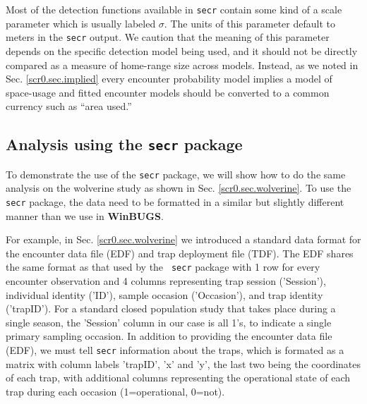 Most of the detection functions available in \mbox{\tt secr} contain
some kind of a scale parameter which is usually labeled $\sigma$.  The
units of this parameter default to meters in the \mbox{\tt secr}
output.  We caution that the meaning of this parameter depends on the
specific detection model being used, and it should not be directly compared as a
measure of home-range size across models. Instead, as we noted in
Sec. \ref{scr0.sec.implied} every encounter probability model implies
a model of space-usage and fitted encounter models should be converted
to a common currency such as ``area used.''


\subsection{Analysis using the \mbox{\tt secr} package}
\label{mle.sec.wolvsecr}

To demonstrate the use of the \mbox{\tt secr} package, we will show
how to do the same analysis on the wolverine study as shown in
Sec. \ref{scr0.sec.wolverine}. To use the \mbox{\tt secr} package, the
data need to be formatted in a similar but slightly different manner
than we use in {\bf WinBUGS}.

For example, in Sec. \ref{scr0.sec.wolverine} we introduced a standard
data format for the encounter data file (EDF) and trap deployment file
(TDF). The EDF shares the same format as that used by the \mbox{\tt
  secr} package with 1 row for every encounter observation and 4
columns representing trap session ('Session'), individual identity
('ID'), sample occasion ('Occasion'), and trap identity ('trapID').
For a standard closed population study that takes place during a
single season, the 'Session' column in our case is all 1's, to indicate
a single primary sampling occasion.  In addition to providing the
encounter data file (EDF), we must tell \mbox{\tt secr} information
about the traps, which is formated as a matrix with column labels
'trapID', 'x' and 'y', the last two being the coordinates of each
trap, with additional columns representing the operational state of
each trap during each occasion (1=operational, 0=not).

